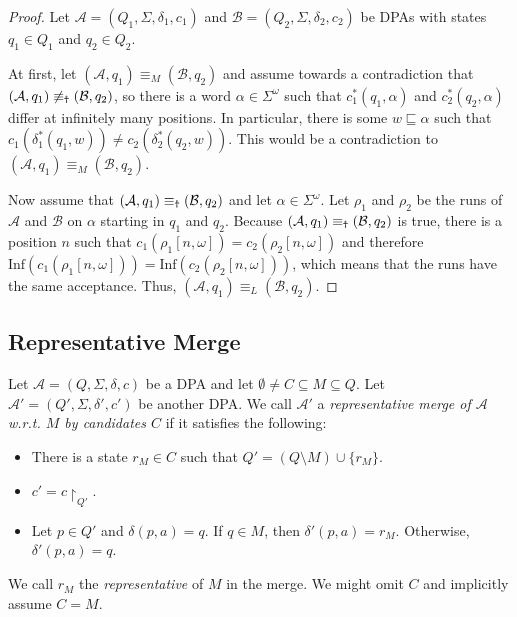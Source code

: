 \begin{proof}
	Let $\mathcal{A} = (Q_1, \Sigma, \delta_1, c_1)$ and $\mathcal{B} = (Q_2, \Sigma, \delta_2, c_2)$ be DPAs with states $q_1 \in Q_1$ and $q_2 \in Q_2$. 
	
	At first, let $(\mathcal{A}, q_1) \equiv_M (\mathcal{B}, q_2)$ and assume towards a contradiction that $(\mathcal{A}, q_1) \not\equiv_\text{\Ankh} (\mathcal{B}, q_2)$, so there is a word $\alpha \in \Sigma^\omega$ such that $c_1^*(q_1, \alpha)$ and $c_2^*(q_2, \alpha)$ differ at infinitely many positions. In particular, there is some $w \sqsubseteq \alpha$ such that $c_1(\delta_1^*(q_1, w)) \neq c_2(\delta_2^*(q_2, w))$. This would be a contradiction to $(\mathcal{A}, q_1) \equiv_M (\mathcal{B}, q_2)$.
	
	Now assume that $(\mathcal{A}, q_1) \equiv_\text{\Ankh} (\mathcal{B}, q_2)$ and let $\alpha \in \Sigma^\omega$. Let $\rho_1$ and $\rho_2$ be the runs of $\mathcal{A}$ and $\mathcal{B}$ on $\alpha$ starting in $q_1$ and $q_2$. Because $(\mathcal{A}, q_1) \equiv_\text{\Ankh} (\mathcal{B}, q_2)$ is true, there is a position $n$ such that $c_1(\rho_1[n,\omega]) = c_2(\rho_2[n,\omega])$ and therefore $\text{Inf}(c_1(\rho_1[n,\omega])) = \text{Inf}(c_2(\rho_2[n,\omega]))$, which means that the runs have the same acceptance. Thus, $(\mathcal{A}, q_1) \equiv_L (\mathcal{B}, q_2)$.
\end{proof}






\subsection{Representative Merge}

\begin{defn}
	Let $\mathcal{A} = (Q, \Sigma, \delta, c)$ be a DPA and let $\emptyset \neq C \subseteq M \subseteq Q$. Let $\mathcal{A}' = (Q', \Sigma, \delta', c')$ be another DPA. We call $\mathcal{A}'$ a \emph{representative merge of $\mathcal{A}$ w.r.t. $M$ by candidates $C$} if it satisfies the following:
	\begin{itemize}
		\item There is a state $r_M \in C$ such that $Q' = (Q \setminus M) \cup \{r_M\}$.
		\item $c' = c\upharpoonright_{Q'}$.
		\item Let $p \in Q'$ and $\delta(p, a) = q$. If $q \in M $, then $\delta'(p, a) = r_M$. Otherwise, $\delta'(p, a) = q$. 
	\end{itemize}
	
	We call $r_M$ the \emph{representative} of $M$ in the merge. We might omit $C$ and implicitly assume $C = M$.
\end{defn}

